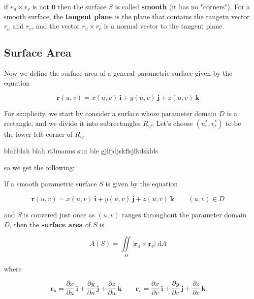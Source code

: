 \documentclass{article}
\begin{document}
if $r_u \times r_v $ is not $\mathbf{0 }$ then the surface $S$ is called \textbf{smooth} (it has no "corners"). For a smooth surface, the \textbf{tangent plane} is the plane that contains the tangetn vector $r_u$ and $r_v$, and the vector $r_u \times r_v$ is a normal vector to the tangent plane.

\subsection{Surface Area}

Now we define the surface area of a general parametric  surface given by the equation 

\begin{equation*}
    \mathbf{r}(u,v) = x(u,v) \ \mathbf{i} + y(u,v) \ \mathbf{j} + z(u,v) \ \mathbf{k}
\end{equation*}

For simplicity, we start by consider a surface whose parameter domain $D$ is a rectangle, and we divide it into subrectangles $R_{ij}$. Let's choose $(u_i^*, v_i^*)$ to be the lower left corner of $R_{ij}$

blahblah blah ri3manns sun ble gjlfjdjskflsjlkdsklds

so we get the following:

If a smooth parametric surface $S$ is given by the equation 

\begin{equation*}
    \mathbf{r}(u,v) = x(u,v) \ \mathbf{i} + y(u,v) \ \mathbf{j} + z(u,v) \ \mathbf{k} \qquad (u,v) \in D
\end{equation*}

and $S$ is convered just once as $(u,v)$ ranges throughout the parameter domain $D$, then the \textbf{surface area} of $S$ is 

\begin{equation*}
    A(S) = \iint\limits_{D} \rvert \mathbf{r}_u \times \mathbf{r}_v \rvert \ \mathrm{d} A
\end{equation*}

where 

\begin{equation*}
    \mathbf{r}_u = \frac{\partial x}{\partial u} \ \mathbf{i} + \frac{\partial y}{\partial u} \ \mathbf{j} + \frac{\partial z}{ \partial u} \ \mathbf{k} \qquad \mathbf{r}_v = \frac{\partial x}{\partial v} \ \mathbf{i} + \frac{\partial y}{\partial v} \ \mathbf{j} + \frac{\partial z}{ \partial v} \ \mathbf{k}
\end{equation*}
\end{document}
